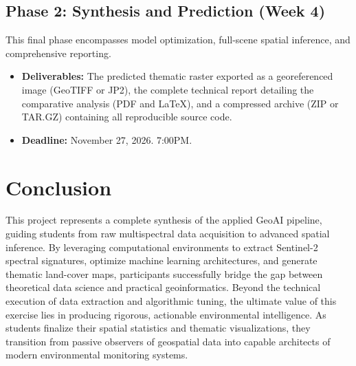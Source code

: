 \documentclass{article}
\begin{document}
\subsection*{Phase 2: Synthesis and Prediction (Week 4)}
This final phase encompasses model optimization, full-scene spatial inference, and comprehensive reporting.
\begin{itemize}
    \item \textbf{Deliverables:} The predicted thematic raster exported as a georeferenced image (GeoTIFF or JP2), the complete technical report detailing the comparative analysis (PDF and \LaTeX), and a compressed archive (ZIP or TAR.GZ) containing all reproducible source code.
    \item \textbf{Deadline:} November 27, 2026. 7:00PM.
\end{itemize}

\section{Conclusion}
This project represents a complete synthesis of the applied GeoAI pipeline, guiding students from raw multispectral data acquisition to advanced spatial inference. By leveraging computational environments to extract Sentinel-2 spectral signatures, optimize machine learning architectures, and generate thematic land-cover maps, participants successfully bridge the gap between theoretical data science and practical geoinformatics. Beyond the technical execution of data extraction and algorithmic tuning, the ultimate value of this exercise lies in producing rigorous, actionable environmental intelligence. As students finalize their spatial statistics and thematic visualizations, they transition from passive observers of geospatial data into capable architects of modern environmental monitoring systems.
\end{document}
